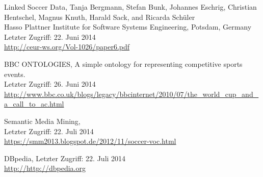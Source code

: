 \documentclass[runningheads,a4paper]{llncs}
\begin{document}
\begin{thebibliography}{4}

Linked Soccer Data,
Tanja Bergmann, Stefan Bunk, Johannes Eschrig, Christian Hentschel, Magnus Knuth, Harald Sack, and Ricarda Schüler\\
Hasso Plattner Institute for Software Systems Engineering, Potsdam, Germany\\
Letzter Zugriff: 22. Juni 2014\\
\url{http://ceur-ws.org/Vol-1026/paper6.pdf}

BBC ONTOLOGIES, A simple ontology for representing competitive sports events.\\
Letzter Zugriff: 26. Juni 2014\\
\url{http://www.bbc.co.uk/blogs/legacy/bbcinternet/2010/07/the_world_cup_and_a_call_to_ac.html}

Semantic Media Mining,\\
Letzter Zugriff: 22. Juli 2014\\
\url{https://smm2013.blogspot.de/2012/11/soccer-voc.html}

DBpedia,
Letzter Zugriff: 22. Juli 2014\\
\url{http://http://dbpedia.org}


\end{thebibliography}
\end{document}
